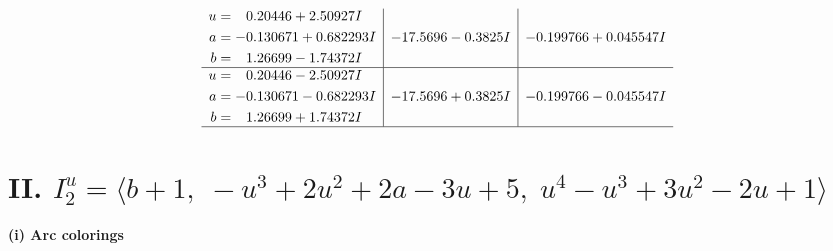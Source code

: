 \documentclass[1p]{elsarticle_modified}
\theoremstyle{definition}
\begin{document}
$$\begin{array}{c|c|c}
\begin{aligned}
u &= \phantom{-}0.20446 + 2.50927 I \\
a &= -0.130671 + 0.682293 I \\
b &= \phantom{-}1.26699 - 1.74372 I\end{aligned}
 & -17.5696 - 0.3825 I & -0.199766 + 0.045547 I \\ \hline\begin{aligned}
u &= \phantom{-}0.20446 - 2.50927 I \\
a &= -0.130671 - 0.682293 I \\
b &= \phantom{-}1.26699 + 1.74372 I\end{aligned}
 & -17.5696 + 0.3825 I & -0.199766 - 0.045547 I\\
 \hline 
 \end{array}$$\newpage\newpage\renewcommand{\arraystretch}{1}
\centering \section*{II. $I^u_{2}= \langle b+1,\;- u^3+2 u^2+2 a-3 u+5,\;u^4- u^3+3 u^2-2 u+1 \rangle$}
\flushleft \textbf{(i) Arc colorings}\\
\end{document}
